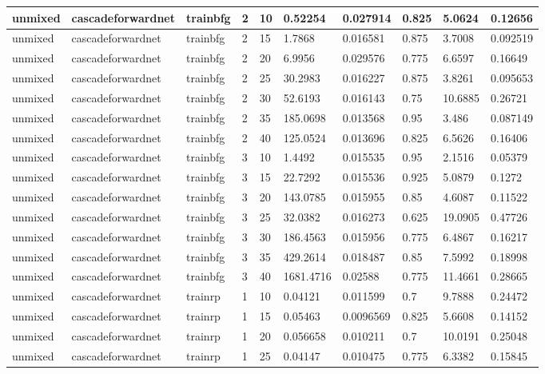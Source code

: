 \begin{longtable}{lllllllll}
unmixed & cascadeforwardnet & trainbfg & 2 & 10 & 0.52254 & 0.027914 & 0.825 & 5.0624 & 0.12656 \\ \hline 
unmixed & cascadeforwardnet & trainbfg & 2 & 15 & 1.7868 & 0.016581 & 0.875 & 3.7008 & 0.092519 \\ \hline 
unmixed & cascadeforwardnet & trainbfg & 2 & 20 & 6.9956 & 0.029576 & 0.775 & 6.6597 & 0.16649 \\ \hline 
unmixed & cascadeforwardnet & trainbfg & 2 & 25 & 30.2983 & 0.016227 & 0.875 & 3.8261 & 0.095653 \\ \hline 
unmixed & cascadeforwardnet & trainbfg & 2 & 30 & 52.6193 & 0.016143 & 0.75 & 10.6885 & 0.26721 \\ \hline 
unmixed & cascadeforwardnet & trainbfg & 2 & 35 & 185.0698 & 0.013568 & 0.95 & 3.486 & 0.087149 \\ \hline 
unmixed & cascadeforwardnet & trainbfg & 2 & 40 & 125.0524 & 0.013696 & 0.825 & 6.5626 & 0.16406 \\ \hline 
unmixed & cascadeforwardnet & trainbfg & 3 & 10 & 1.4492 & 0.015535 & 0.95 & 2.1516 & 0.05379 \\ \hline 
unmixed & cascadeforwardnet & trainbfg & 3 & 15 & 22.7292 & 0.015536 & 0.925 & 5.0879 & 0.1272 \\ \hline 
unmixed & cascadeforwardnet & trainbfg & 3 & 20 & 143.0785 & 0.015955 & 0.85 & 4.6087 & 0.11522 \\ \hline 
unmixed & cascadeforwardnet & trainbfg & 3 & 25 & 32.0382 & 0.016273 & 0.625 & 19.0905 & 0.47726 \\ \hline 
unmixed & cascadeforwardnet & trainbfg & 3 & 30 & 186.4563 & 0.015956 & 0.775 & 6.4867 & 0.16217 \\ \hline 
unmixed & cascadeforwardnet & trainbfg & 3 & 35 & 429.2614 & 0.018487 & 0.85 & 7.5992 & 0.18998 \\ \hline 
unmixed & cascadeforwardnet & trainbfg & 3 & 40 & 1681.4716 & 0.02588 & 0.775 & 11.4661 & 0.28665 \\ \hline 
unmixed & cascadeforwardnet & trainrp & 1 & 10 & 0.04121 & 0.011599 & 0.7 & 9.7888 & 0.24472 \\ \hline 
unmixed & cascadeforwardnet & trainrp & 1 & 15 & 0.05463 & 0.0096569 & 0.825 & 5.6608 & 0.14152 \\ \hline 
unmixed & cascadeforwardnet & trainrp & 1 & 20 & 0.056658 & 0.010211 & 0.7 & 10.0191 & 0.25048 \\ \hline 
unmixed & cascadeforwardnet & trainrp & 1 & 25 & 0.04147 & 0.010475 & 0.775 & 6.3382 & 0.15845 \\ \hline 

\end{longtable}
